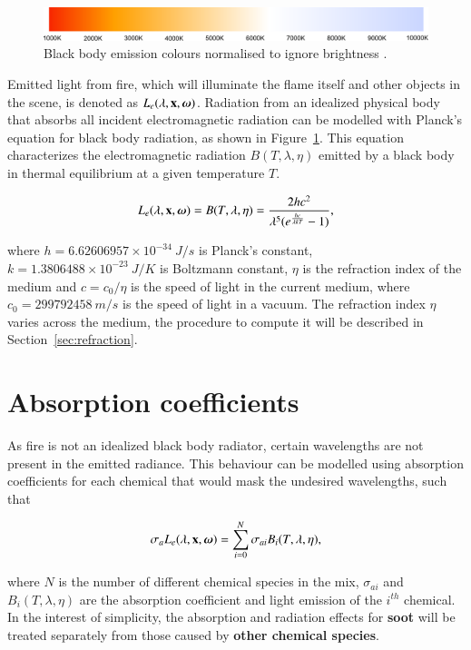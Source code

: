 \begin{figure}[htbp!]
	\centering
	\includegraphics[width=\textwidth]{img/black_body_diag}
	\caption{Black body emission colours normalised to ignore brightness \cite{BlackBody}.}
	\label{fig:black_body_diag}
\end{figure}

Emitted light from fire, which will illuminate the flame itself and other objects in the scene, is denoted as $L_e(\lambda, \mathbf{x}, \boldsymbol{\omega})$. 
Radiation from an idealized physical body that absorbs all incident electromagnetic radiation can be modelled with Planck's equation for black body radiation, as shown in Figure~\ref{fig:black_body_diag}.
This equation characterizes the electromagnetic radiation $B(T, \lambda, \eta)$ emitted by a black body in thermal equilibrium at a given temperature $T$.

\begin{equation}
L_e(\lambda, \mathbf{x}, \boldsymbol{\omega}) = B(T, \lambda, \eta) = \frac{2 h c^2}{\lambda^5  (e ^\frac{h c}{\lambda k T} - 1)},
\end{equation}

where $h = 6.62606957 \times 10^{-34}~J/s$ is Planck's constant, $k = 1.3806488 \times 10^{-23}~J/K$ is Boltzmann constant, $\eta$ is the refraction index of the medium and $c =  c_0 / \eta$ is the speed of light in the current medium, where $c_0 = 299792458~m/s$ is the speed of light in a vacuum. 
The refraction index $\eta$ varies across the medium, the procedure to compute it will be described in Section~\ref{sec:refraction}.

\section{Absorption coefficients}
\label{sec:absorption_coefficients}

As fire is not an idealized black body radiator, certain wavelengths are not present in the emitted radiance.
This behaviour can be modelled using absorption coefficients for each chemical that would mask the undesired wavelengths, such that

\begin{equation}
\sigma_a L_e(\lambda, \mathbf{x}, \boldsymbol{\omega}) = \sum_{i = 0}^N \sigma_{ai} B_i(T, \lambda, \eta),
\end{equation}

where $N$ is the number of different chemical species in the mix, $\sigma_{ai}$ and $B_i(T, \lambda, \eta)$ are the absorption coefficient and light emission of the $i^{th}$ chemical.
In the interest of simplicity, the absorption and radiation effects for \textbf{soot} will be treated separately from those caused by \textbf{other chemical species}.

